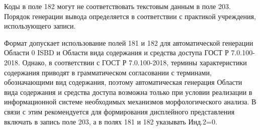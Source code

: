 Коды в поле 182 могут не соответствовать текстовым данным в поле 203. Порядок генерации вывода определяется в соответствии с практикой учреждения, использующего записи.

Формат допускает использование полей 181 и 182 для автоматической генерации Области 0 ISBD и Области вида содержания и средства доступа ГОСТ Р 7.0.100-2018. Однако, в соответствии с ГОСТ Р 7.0.100-2018, термины характеристики содержания приводят в грамматическом согласовании с терминами, обозначающими вид содержания, поэтому автоматическая генерация Области вида содержания и средства доступа возможна только при условии реализации в информационной системе необходимых механизмов морфологического анализа. В связи с этим рекомендуется для формирования дисплейного представления включать в запись поле 203, а в полях 181 и 182 указывать Инд.2=0.
